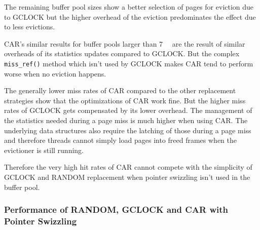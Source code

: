     The remaining buffer pool sizes show a better selection of pages for eviction due to GCLOCK but the higher overhead of the eviction predominates the effect due to less evictions.

    CAR's similar results for buffer pools larger than \SI{7}{\gibi\byte} are the result of similar overheads of its statistics updates compared to GCLOCK. But the complex \lstinline{miss_ref()} method which isn't used by GCLOCK makes CAR tend to perform worse when no eviction happens.

    The generally lower miss rates of CAR compared to the other replacement strategies show that the optimizations of CAR work fine. But the higher miss rates of GCLOCK gets compensated by its lower overhead. The management of the statistics needed during a page miss is much higher when using CAR. The underlying data structures also require the latching of those during a page miss and therefore threads cannot simply load pages into freed frames when the evictioner is still running.

    Therefore the very high hit rates of CAR cannot compete with the simplicity of GCLOCK and RANDOM replacement when pointer swizzling isn't used in the buffer pool.

\subsubsection{Performance of RANDOM, GCLOCK and CAR with Pointer Swizzling}

